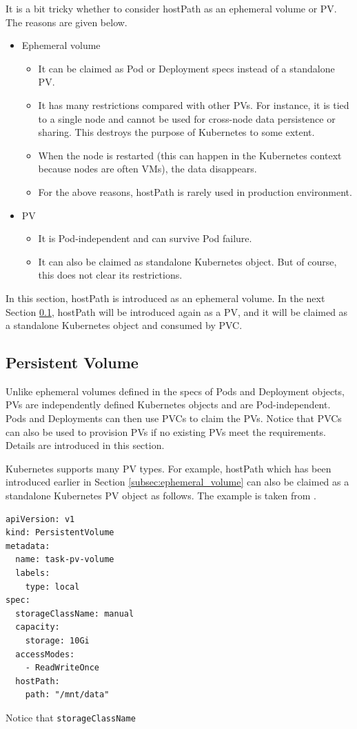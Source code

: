 It is a bit tricky whether to consider hostPath as an ephemeral volume or PV. The reasons are given below.
\begin{itemize}
	\item Ephemeral volume
	\begin{itemize}
		\item It can be claimed as Pod or Deployment specs instead of a standalone PV.
		\item It has many restrictions compared with other PVs. For instance, it is tied to a single node and cannot be used for cross-node data persistence or sharing. This destroys the purpose of Kubernetes to some extent.
		\item When the node is restarted (this can happen in the Kubernetes context because nodes are often VMs), the data disappears.
		\item For the above reasons, hostPath is rarely used in production environment.
	\end{itemize}
	\item PV
	\begin{itemize}
		\item It is Pod-independent and can survive Pod failure.
		\item It can also be claimed as standalone Kubernetes object. But of course, this does not clear its restrictions.
	\end{itemize}
\end{itemize}
In this section, hostPath is introduced as an ephemeral volume. In the next Section \ref{subsec:persistentvolume}, hostPath will be introduced again as a PV, and it will be claimed as a standalone Kubernetes object and consumed by PVC.

\subsection{Persistent Volume} \label{subsec:persistentvolume}

Unlike ephemeral volumes defined in the specs of Pods and Deployment objects, PVs are independently defined Kubernetes objects and are Pod-independent. Pods and Deployments can then use PVCs to claim the PVs. Notice that PVCs can also be used to provision PVs if no existing PVs meet the requirements. Details are introduced in this section.

Kubernetes supports many PV types. For example, hostPath which has been introduced earlier in Section \ref{subsec:ephemeral_volume} can also be claimed as a standalone Kubernetes PV object as follows. The example is taken from \cite{kubernetes2024doc}.
\begin{lstlisting}
apiVersion: v1
kind: PersistentVolume
metadata:
  name: task-pv-volume
  labels:
    type: local
spec:
  storageClassName: manual
  capacity:
    storage: 10Gi
  accessModes:
    - ReadWriteOnce
  hostPath:
    path: "/mnt/data"
\end{lstlisting}
Notice that \texttt{storageClassName}

